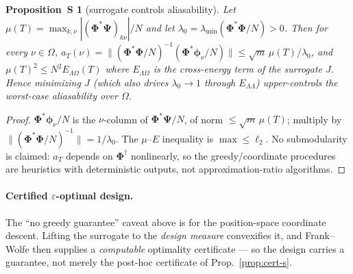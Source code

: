 \documentclass[10pt]{article}
\newtheorem{proposition}{Proposition~S}
\newcommand{\Phimat}{\bm{\Phi}}
\newcommand{\Psimat}{\bm{\Psi}}
\newcommand{\norm}[1]{\lVert#1\rVert}
\newcommand{\at}{a_T}
\begin{document}
\begin{proposition}[surrogate controls aliasability]
Let $\mu(T)=\max_{k,\nu}|(\Phimat^{*}\Psimat)_{k\nu}|/N$ and let $\lambda_0=\lambda_{\min}
(\Phimat^{*}\Phimat/N)>0$.  Then for every $\nu\in\Omega$,
$\at(\nu)=\norm{(\Phimat^{*}\Phimat/N)^{-1}(\Phimat^{*}\bm\phi_\nu/N)}\le
\sqrt m\,\mu(T)/\lambda_0$, and $\mu(T)^2\le N^2 E_{\Lambda\Omega}(T)$ where
$E_{\Lambda\Omega}$ is the cross-energy term of the surrogate $J$.  Hence minimizing $J$
(which also drives $\lambda_0\!\to\!1$ through $E_{\Lambda\Lambda}$) upper-controls the
worst-case aliasability over $\Omega$.
\end{proposition}
\begin{proof}
$\Phimat^{*}\bm\phi_\nu/N$ is the $\nu$-column of $\Phimat^{*}\Psimat/N$, of norm
$\le\sqrt m\,\mu(T)$; multiply by $\norm{(\Phimat^{*}\Phimat/N)^{-1}}=1/\lambda_0$.  The
$\mu$--$E$ inequality is $\max\le\ell_2$.  No submodularity is claimed: $\at$ depends on
$\Phimat^{\dagger}$ nonlinearly, so the greedy/coordinate procedures are heuristics with
deterministic outputs, not approximation-ratio algorithms.
\end{proof}

\paragraph{Certified $\varepsilon$-optimal design.}  The ``no greedy guarantee'' caveat above is
for the position-space coordinate descent.  Lifting the surrogate to the \emph{design measure}
convexifies it, and Frank--Wolfe then supplies a \emph{computable} optimality certificate --- so
the design carries a guarantee, not merely the post-hoc certificate of Prop.~\ref{prop:cert-s}.

\end{document}
